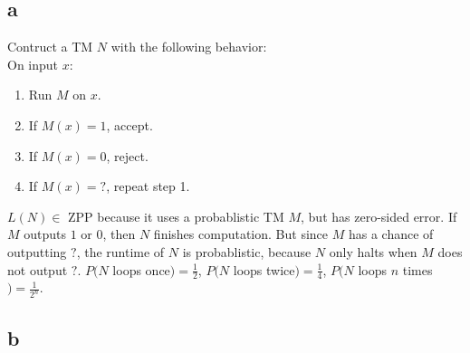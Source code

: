 \documentclass[letterpaper,notitlepage,twoside]{article}
\begin{document}
\subsection*{a}
Contruct a TM $N$ with the following behavior: \\
On input $x$:
\begin{enumerate}
  \item Run $M$ on $x$.
  \item If $M(x) = 1$, accept.
  \item If $M(x) = 0$, reject.
  \item If $M(x) = ?$, repeat step 1.
\end{enumerate}
$L(N) \in$ ZPP because it uses a probablistic TM $M$, but has zero-sided error. If $M$ outputs $1$ or $0$, then $N$ finishes computation. But since $M$ has a chance of outputting $?$, the runtime of $N$ is probablistic, because $N$ only halts when $M$ does not output $?$. $P(N$ loops once$) = \frac{1}{2}$, $P(N$ loops twice$) = \frac{1}{4}$, $P(N$ loops $n$ times$) = \frac{1}{2^n}$.
\subsection*{b}
\end{document}

